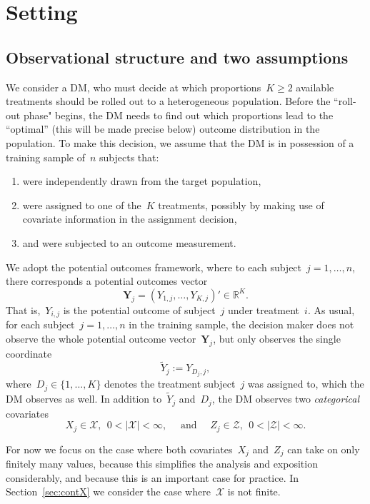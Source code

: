 \documentclass[11pt, a4paper]{article}
\newcommand{\R}{\mathbb{R}}
\theoremstyle{definition}
\begin{document}
\section{Setting}\label{sec:setting}

\subsection{Observational structure and two assumptions}

We consider a DM, who must decide at which proportions~$K\geq 2$ available treatments should be rolled out to a heterogeneous population. Before the ``roll-out phase" begins, the DM needs to find out which proportions lead to the ``optimal'' (this will be made precise below) outcome distribution in the population. To make this decision, we assume that the DM is in possession of a training sample of~$n$ subjects that:
%
\begin{enumerate}
\item were independently drawn from the target population,
\item were assigned to one of the~$K$ treatments, possibly by making use of covariate information in the assignment decision,
\item and were subjected to an outcome measurement.
\end{enumerate}

We adopt the potential outcomes framework, where to each subject~$j = 1, \hdots, n$, there corresponds a potential outcomes vector
\begin{equation*}
\bm{Y}_j = \left(Y_{1,j}, \hdots, Y_{K,j}\right)' \in \R^K.
\end{equation*}
%
That is,~$Y_{i,j}$ is the potential outcome of subject~$j$ under treatment~$i$. As usual, for each subject~$j = 1, \hdots, n$ in the training sample, the decision maker does not observe the whole potential outcome vector~$\bm{Y}_j$, but only observes the single coordinate~$$\tilde{Y}_j := Y_{D_j, j},$$ where~$D_j \in \{1, \hdots, K\}$ denotes the treatment subject~$j$ was assigned to, which the DM observes as well. In addition to~$\tilde{Y}_j $ and~$D_j$, the DM observes two \emph{categorical} covariates $$X_j \in \mathcal{X},~~0 < |\mathcal{X}|< \infty, \quad \text{ and } \quad Z_j \in \mathcal{Z},~~0 < |\mathcal{Z}|< \infty.$$ 

For now we focus on the case where both covariates~$X_j$ and~$Z_j$ can take on only finitely many values, because this simplifies the analysis and exposition considerably, and because this is an important case for practice. In Section~\ref{sec:contX} we consider the case where~$\mathcal{X}$ is not finite.
\end{document}
